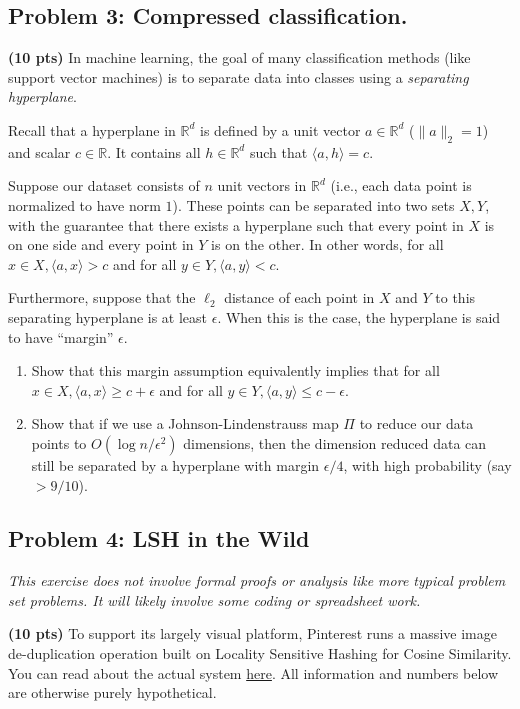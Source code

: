 \documentclass[10pt]{article}
\newcommand{\R}{\mathbb{R}}
\begin{document}
\subsection{Problem 3: Compressed classification.}
\textbf{(10 pts)} In machine learning, the goal of many classification methods (like support vector machines) is to separate data into classes using a \emph{separating hyperplane}.

Recall that a hyperplane in $\R^d$ is defined by a unit vector $a \in \R^d$ ($\|a\|_2 = 1$) and scalar $c \in \R$. It contains all  $h \in \R^d$ such that $\langle a, h\rangle = c$. 

Suppose our dataset consists of $n$ unit vectors in $\R^d$ (i.e., each data point is normalized to have norm $1$). These points can be separated into two sets $X, Y$,
with the guarantee that there exists a hyperplane such that every point in $X$ is on one side and every point in 
$Y$ is on the other. In other words, for all $x\in X, \langle a, x\rangle > c$ and for all $y\in Y, \langle a, y\rangle < c$.

Furthermore, suppose that the $\ell_2$ distance of each point in $X$ and $Y$ to this separating hyperplane is at least $\epsilon$. When this is the case, the hyperplane is said to have ``margin'' $\epsilon$. 

\begin{enumerate}
	\item Show that this margin assumption equivalently implies that for all $x\in X, \langle a, x\rangle \geq c + \epsilon$ and for all $y\in Y, \langle a, y\rangle \leq c - \epsilon$.
	
	\item Show that if we use a Johnson-Lindenstrauss map $\Pi$ to reduce our data points to $O(\log n/\epsilon^2)$ dimensions, then the dimension reduced data can still be separated by a hyperplane with margin $\epsilon/4$, with high probability (say $> 9/10$).
\end{enumerate}

\subsection{Problem 4: LSH in the Wild} 
\textit{This exercise does not involve formal proofs or analysis like more typical problem set problems. It will likely involve some coding or spreadsheet work.}
\vspace{.25em}

\noindent\textbf{(10 pts)}
To support its largely visual platform, Pinterest runs a massive image de-duplication operation built on Locality Sensitive Hashing for Cosine Similarity. You can read about the actual system \href{https://medium.com/pinterest-engineering/detecting-image-similarity-using-spark-lsh-and-tensorflow-618636afc939}{here}. All information and numbers below are otherwise purely hypothetical.
\end{document}
